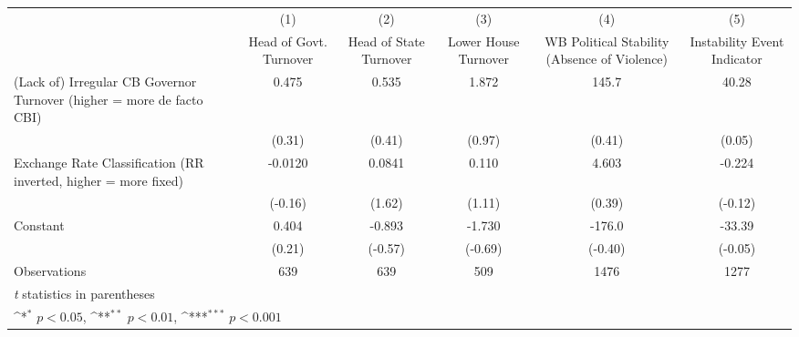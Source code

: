 {
\def\sym#1{\ifmmode^{#1}\else\(^{#1}\)\fi}
\begin{tabular*}{\linewidth}{@{\hskip\tabcolsep\extracolsep\fill}l*{5}{c}}
\toprule
                &\multicolumn{1}{c}{(1)}&\multicolumn{1}{c}{(2)}&\multicolumn{1}{c}{(3)}&\multicolumn{1}{c}{(4)}&\multicolumn{1}{c}{(5)}\\
                &\multicolumn{1}{c}{Head of Govt. Turnover}&\multicolumn{1}{c}{Head of State Turnover}&\multicolumn{1}{c}{Lower House Turnover}&\multicolumn{1}{c}{WB Political Stability (Absence of Violence)}&\multicolumn{1}{c}{Instability Event Indicator}\\
\midrule
(Lack of) Irregular CB Governor Turnover (higher = more de facto CBI)&    0.475         &    0.535         &    1.872         &    145.7         &    40.28         \\
                &   (0.31)         &   (0.41)         &   (0.97)         &   (0.41)         &   (0.05)         \\
\addlinespace
Exchange Rate Classification (RR inverted, higher = more fixed)&  -0.0120         &   0.0841         &    0.110         &    4.603         &   -0.224         \\
                &  (-0.16)         &   (1.62)         &   (1.11)         &   (0.39)         &  (-0.12)         \\
\addlinespace
Constant        &    0.404         &   -0.893         &   -1.730         &   -176.0         &   -33.39         \\
                &   (0.21)         &  (-0.57)         &  (-0.69)         &  (-0.40)         &  (-0.05)         \\
\midrule
Observations    &      639         &      639         &      509         &     1476         &     1277         \\
\bottomrule
\multicolumn{6}{l}{\footnotesize \textit{t} statistics in parentheses}\\
\multicolumn{6}{l}{\footnotesize \sym{*} \(p<0.05\), \sym{**} \(p<0.01\), \sym{***} \(p<0.001\)}\\
\end{tabular*}
}
